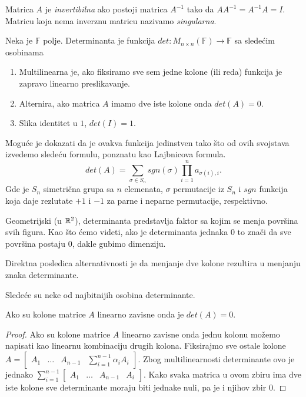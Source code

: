 \documentclass{article}
\begin{document}
\begin{definition}[Invertibilnost]
  Matrica $A$ je \textit{invertibilna} ako postoji matrica $A^{-1}$ tako da $AA^{-1} = A^{-1}A = I$.
  Matricu koja nema inverznu matricu nazivamo \textit{singularna}.
\end{definition}

\begin{definition}[Determinanta]
  Neka je $\mathbb{F}$ polje.
  Determinanta je funkcija $det : M_{n \times n} (\mathbb{F}) \to \mathbb{F}$ sa sledećim osobinama
  \begin{enumerate}
    \item Multilinearna je, ako fiksiramo sve sem jedne kolone (ili reda) funkcija je zapravo linearno preslikavanje.
    \item Alternira, ako matrica $A$ imamo dve iste kolone onda $det(A) = 0$.
    \item Slika identitet u $1$, $det(I) = 1$.
  \end{enumerate}

  Moguće je dokazati da je ovakva funkcija jedinstven tako što od ovih svojstava izvedemo sledeću formulu, ponznatu kao Lajbnicova formula.
  \[det(A) = \sum_{\sigma \in S_n} sgn(\sigma) \prod_{i = 1}^{n} a_{\sigma(i), i}.\]
  Gde je $S_n$ simetrična grupa sa $n$ elemenata, $\sigma$ permutacije iz $S_n$ i $sgn$ funkcija koja daje rezlutate $+1$ i $-1$ za parne i neparne permutacije, respektivno.
\end{definition}

Geometrijski (u $\mathbb{R}^2$), determinanta predstavlja faktor sa kojim se menja površina svih figura.
Kao što ćemo videti, ako je determinanta jednaka $0$ to znači da sve površina postaju $0$, dakle gubimo dimenziju.

Direktna posledica alternativnosti je da menjanje dve kolone rezultira u menjanju znaka determinante.

Sledeće su neke od najbitnijih osobina determinante.

\begin{theorem}
  Ako su kolone matrice $A$ linearno zavisne onda je $det(A) = 0$.
\end{theorem}

\begin{proof}
  Ako su kolone matrice $A$ linearno zavisne onda jednu kolonu možemo napisati kao linearnu kombinaciju drugih kolona.
  Fiksirajmo sve ostale kolone $A = \begin{bmatrix} A_1 & \ldots & A_{n - 1} & \sum_{i = 1}^{n - 1} \alpha_i A_i \end{bmatrix}$.
  Zbog multilinearnosti determinante ovo je jednako $\sum_{i = 1}^{n - 1} \begin{bmatrix} A_1 & \ldots & A_{n - 1} & A_i \end{bmatrix}$.
  Kako svaka matrica u ovom zbiru ima dve iste kolone sve determinante moraju biti jednake nuli, pa je i njihov zbir 0.
\end{proof}
\end{document}
